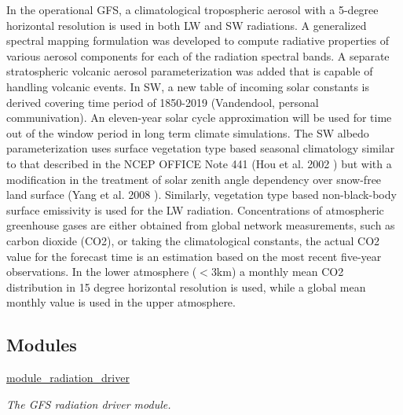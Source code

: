 In the operational G\+FS, a climatological tropospheric aerosol with a 5-\/degree horizontal resolution is used in both LW and SW radiations. A generalized spectral mapping formulation was developed to compute radiative properties of various aerosol components for each of the radiation spectral bands. A separate stratospheric volcanic aerosol parameterization was added that is capable of handling volcanic events. In SW, a new table of incoming solar constants is derived covering time period of 1850-\/2019 (Vandendool, personal communivation). An eleven-\/year solar cycle approximation will be used for time out of the window period in long term climate simulations. The SW albedo parameterization uses surface vegetation type based seasonal climatology similar to that described in the N\+C\+EP O\+F\+F\+I\+CE Note 441 (Hou et al. 2002 \cite{hou_et_al_2002}) but with a modification in the treatment of solar zenith angle dependency over snow-\/free land surface (Yang et al. 2008 \cite{yang_et_al_2008}). Similarly, vegetation type based non-\/black-\/body surface emissivity is used for the LW radiation. Concentrations of atmospheric greenhouse gases are either obtained from global network measurements, such as carbon dioxide (C\+O2), or taking the climatological constants, the actual C\+O2 value for the forecast time is an estimation based on the most recent five-\/year observations. In the lower atmosphere ($<$3km) a monthly mean C\+O2 distribution in 15 degree horizontal resolution is used, while a global mean monthly value is used in the upper atmosphere. \subsection*{Modules}
\begin{DoxyCompactItemize}
\item 
\hyperlink{group__module__radiation__driver}{module\+\_\+radiation\+\_\+driver}
\begin{DoxyCompactList}\small\item\em The G\+FS radiation driver module. \end{DoxyCompactList}\end{DoxyCompactItemize}
